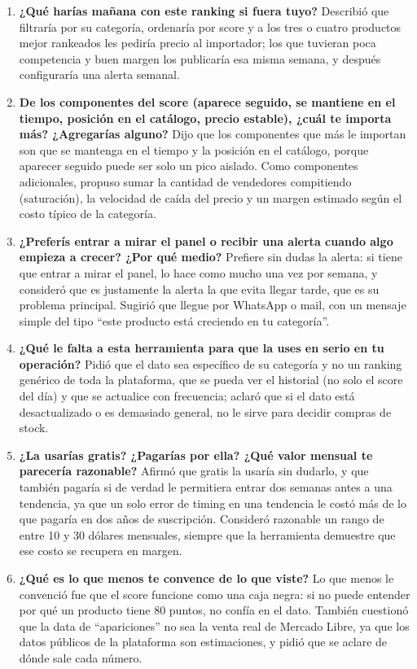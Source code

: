 \begin{enumerate}
	\item \textbf{¿Qué harías mañana con este ranking si fuera tuyo?} Describió que filtraría por su categoría, ordenaría por score y a los tres o cuatro productos mejor rankeados les pediría precio al importador; los que tuvieran poca competencia y buen margen los publicaría esa misma semana, y después configuraría una alerta semanal.
	\item \textbf{De los componentes del score (aparece seguido, se mantiene en el tiempo, posición en el catálogo, precio estable), ¿cuál te importa más? ¿Agregarías alguno?} Dijo que los componentes que más le importan son que se mantenga en el tiempo y la posición en el catálogo, porque aparecer seguido puede ser solo un pico aislado. Como componentes adicionales, propuso sumar la cantidad de vendedores compitiendo (saturación), la velocidad de caída del precio y un margen estimado según el costo típico de la categoría.
	\item \textbf{¿Preferís entrar a mirar el panel o recibir una alerta cuando algo empieza a crecer? ¿Por qué medio?} Prefiere sin dudas la alerta: si tiene que entrar a mirar el panel, lo hace como mucho una vez por semana, y consideró que es justamente la alerta la que evita llegar tarde, que es su problema principal. Sugirió que llegue por WhatsApp o mail, con un mensaje simple del tipo ``este producto está creciendo en tu categoría''.
	\item \textbf{¿Qué le falta a esta herramienta para que la uses en serio en tu operación?} Pidió que el dato sea específico de su categoría y no un ranking genérico de toda la plataforma, que se pueda ver el historial (no solo el score del día) y que se actualice con frecuencia; aclaró que si el dato está desactualizado o es demasiado general, no le sirve para decidir compras de stock.
	\item \textbf{¿La usarías gratis? ¿Pagarías por ella? ¿Qué valor mensual te parecería razonable?} Afirmó que gratis la usaría sin dudarlo, y que también pagaría si de verdad le permitiera entrar dos semanas antes a una tendencia, ya que un solo error de timing en una tendencia le costó más de lo que pagaría en dos años de suscripción. Consideró razonable un rango de entre 10 y 30 dólares mensuales, siempre que la herramienta demuestre que ese costo se recupera en margen.
	\item \textbf{¿Qué es lo que menos te convence de lo que viste?} Lo que menos le convenció fue que el score funcione como una caja negra: si no puede entender por qué un producto tiene 80 puntos, no confía en el dato. También cuestionó que la data de ``apariciones'' no sea la venta real de Mercado Libre, ya que los datos públicos de la plataforma son estimaciones, y pidió que se aclare de dónde sale cada número.
\end{enumerate}
